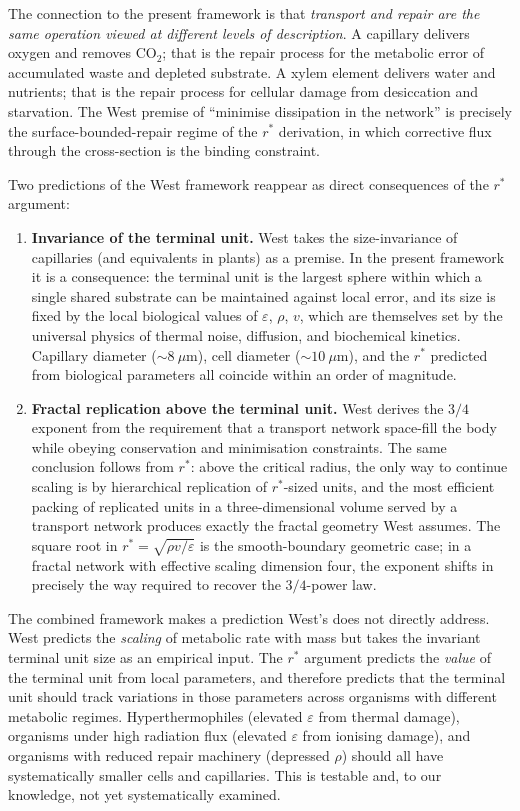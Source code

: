 \documentclass[11pt]{article}
\begin{document}
The connection to the present framework is that \emph{transport and repair are the same operation viewed at different levels of description}. A capillary delivers oxygen and removes $\text{CO}_{2}$; that is the repair process for the metabolic error of accumulated waste and depleted substrate. A xylem element delivers water and nutrients; that is the repair process for cellular damage from desiccation and starvation. The West premise of ``minimise dissipation in the network'' is precisely the surface-bounded-repair regime of the $r^{\ast}$ derivation, in which corrective flux through the cross-section is the binding constraint.

Two predictions of the West framework reappear as direct consequences of the $r^{\ast}$ argument:
\begin{enumerate}[itemsep=2pt,topsep=2pt]
\item \textbf{Invariance of the terminal unit.} West takes the size-invariance of capillaries (and equivalents in plants) as a premise. In the present framework it is a consequence: the terminal unit is the largest sphere within which a single shared substrate can be maintained against local error, and its size is fixed by the local biological values of $\varepsilon$, $\rho$, $v$, which are themselves set by the universal physics of thermal noise, diffusion, and biochemical kinetics. Capillary diameter ($\sim 8~\mu$m), cell diameter ($\sim 10~\mu$m), and the $r^{\ast}$ predicted from biological parameters all coincide within an order of magnitude.
\item \textbf{Fractal replication above the terminal unit.} West derives the $3/4$ exponent from the requirement that a transport network space-fill the body while obeying conservation and minimisation constraints. The same conclusion follows from $r^{\ast}$: above the critical radius, the only way to continue scaling is by hierarchical replication of $r^{\ast}$-sized units, and the most efficient packing of replicated units in a three-dimensional volume served by a transport network produces exactly the fractal geometry West assumes. The square root in $r^{\ast} = \sqrt{\rho v / \varepsilon}$ is the smooth-boundary geometric case; in a fractal network with effective scaling dimension four, the exponent shifts in precisely the way required to recover the $3/4$-power law.
\end{enumerate}

The combined framework makes a prediction West's does not directly address. West predicts the \emph{scaling} of metabolic rate with mass but takes the invariant terminal unit size as an empirical input. The $r^{\ast}$ argument predicts the \emph{value} of the terminal unit from local parameters, and therefore predicts that the terminal unit should track variations in those parameters across organisms with different metabolic regimes. Hyperthermophiles (elevated $\varepsilon$ from thermal damage), organisms under high radiation flux (elevated $\varepsilon$ from ionising damage), and organisms with reduced repair machinery (depressed $\rho$) should all have systematically smaller cells and capillaries. This is testable and, to our knowledge, not yet systematically examined.
\end{document}
